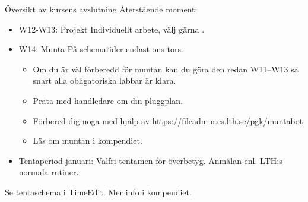
\begin{Slide}{Översikt av kursens avslutning}
Återstående moment:
\begin{itemize}
\item W12-W13: Projekt \hfill Individuellt arbete, välj gärna .
\item W14: Munta \hfill På schematider endast ons-tors.
\begin{itemize}
\item Om du är väl förberedd för muntan kan du göra den redan W11--W13 så snart alla obligatoriska labbar är klara. 
\item Prata med handledare om din pluggplan.
\item Förbered dig noga med hjälp av \url{https://fileadmin.cs.lth.se/pgk/muntabot}
\item Läs om muntan i kompendiet.
\end{itemize}
\item Tentaperiod januari: Valfri tentamen för överbetyg. Anmälan enl. LTH:s normala rutiner. 
\end{itemize}
Se tentaschema i TimeEdit.
\ifkompendium\else
\newline
Mer info i kompendiet.
\fi
\end{Slide}




